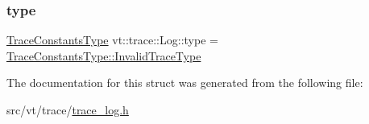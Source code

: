 \mbox{\label{structvt_1_1trace_1_1_log_a6415eacd3721d71029ff6edb909fc63d}} 
\subsubsection{\texorpdfstring{type}{type}}
{\footnotesize\ttfamily \hyperlink{namespacevt_1_1trace_acf454dfbd581b0ebae895f90b5927a1d}{Trace\+Constants\+Type} vt\+::trace\+::\+Log\+::type = \hyperlink{namespacevt_1_1trace_acf454dfbd581b0ebae895f90b5927a1da319f6b5fbfb85275879d449149167c7e}{Trace\+Constants\+Type\+::\+Invalid\+Trace\+Type}}



The documentation for this struct was generated from the following file\+:\begin{DoxyCompactItemize}
\item 
src/vt/trace/\hyperlink{trace__log_8h}{trace\+\_\+log.\+h}\end{DoxyCompactItemize}
